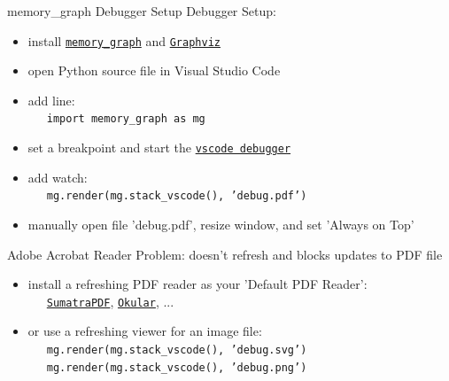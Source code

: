 \documentclass[10pt, colorlinks=true, urlcolor=blue]{beamer}
\begin{document}
\begin{frame}{memory\_graph Debugger Setup}
  \vspace{-1em}
  Debugger Setup:
  \begin{itemize}
  \item install \href{https://pypi.org/project/memory-graph/}{\texttt{memory\_graph}} and \href{https://graphviz.org/download/}{\texttt{Graphviz}}
  \item open Python source file in Visual Studio Code
  \item add line: \\ \ \ \ {\footnotesize \texttt{import memory_graph as mg}}
  \item set a breakpoint and start the \href{https://code.visualstudio.com/docs/python/debugging}{\texttt{vscode debugger}}
  \item add watch: \\ \ \ \ {\footnotesize \texttt{mg.render(mg.stack_vscode(), 'debug.pdf')}}
  \item manually open file 'debug.pdf', resize window,  and set 'Always on Top'
  \end{itemize}
  
  \vspace{1.8em}
  
  Adobe Acrobat Reader Problem: doesn't refresh and blocks updates to PDF file
  \begin{itemize}
  \item install a refreshing PDF reader as your 'Default PDF Reader': \\ \ \ \
    \href{https://www.sumatrapdfreader.org/}{\texttt{SumatraPDF}},
    \href{https://okular.kde.org/}{\texttt{Okular}}, ...
  \item or use a refreshing viewer for an image file: \\
\ \ \ {\footnotesize \texttt{mg.render(mg.stack_vscode(), 'debug.svg')}} \\
\ \ \ {\footnotesize \texttt{mg.render(mg.stack_vscode(), 'debug.png')}}
  \end{itemize}
\end{frame}
\end{document}
